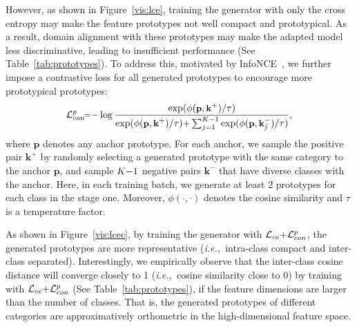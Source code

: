 \documentclass{article}
\def\ie{\emph{i.e.,~}}
\begin{document}
However, as shown in Figure~\ref{vis:lce}, training the generator with only the cross entropy may make the feature prototypes not well compact and prototypical. As a result, domain alignment with these prototypes may make the adapted model less discriminative, leading to insufficient   performance (See Table~\ref{tab:prototypes}). To address this, motivated by InfoNCE~\cite{Oord2018RepresentationLW,Zhang2021UnleashingTP}, we further impose a contrastive loss for all generated prototypes to encourage more prototypical prototypes:
\begin{equation}
\label{eq:C_p}
\mathcal{L}_{con}^{p}\! \small{=}  \small{-}\log \frac{\exp(\phi(\textbf{p}, \textbf{k}^+)/\tau)}{ \exp(\phi(\textbf{p}, \textbf{k}^+)/\tau) \small{+} \sum_{j=1}^{K\small{-}1}\exp(\phi(\textbf{p}, \textbf{k}_j^-)/\tau)},
\end{equation}
where $\textbf{p}$ denotes any anchor prototype. For each anchor,  we sample  the positive pair  $\textbf{k}^+$ by randomly selecting a generated prototype  with  the same category to the anchor $\textbf{p}$,    and sample $K\small{-}1$ negative pairs $\textbf{k}^-$  that have diverse classes with the anchor. Here,  in each training batch, we generate at least 2 prototypes for each class in the stage one. Moreover, $\phi(\cdot,\cdot)$ denotes the cosine similarity and $\tau$ is a temperature factor.





As shown in Figure~\ref{vis:lcec}, by training the generator with $\mathcal{L}_{ce}\small{+}\mathcal{L}_{con}^{p}$, the generated prototypes are more representative (\ie intra-class compact and   inter-class separated). Interestingly, we empirically observe that the inter-class cosine distance will converge closely to 1 (\ie cosine similarity close to 0) by training with $\mathcal{L}_{ce}\small{+}\mathcal{L}_{con}^{p}$ (See Table~\ref{tab:prototypes}),  if the feature dimensions are larger than the number of classes. That is, the generated prototypes of different categories are approximatively orthometric in the high-dimensional feature space.  
\end{document}
